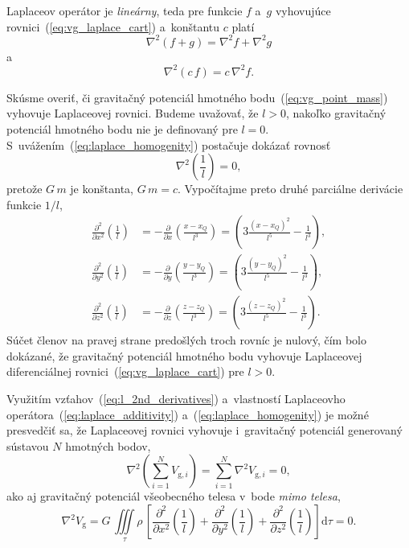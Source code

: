 \documentclass[a4paper,12pt]{book}
\newcommand{\diff}{\mathrm d}
\newcommand{\gidx}{\mathrm g}
\begin{document}
Laplaceov operátor je \emph{lineárny}, teda pre funkcie
$f$ a~$g$ vyhovujúce rovnici~(\ref{eq:vg_laplace_cart}) a~konštantu $c$ platí
%
\begin{equation}
\label{eq:laplace_additivity}
\nabla^2 \left(f + g \right) = \nabla^2 f + \nabla^2 g
\end{equation}
%
a
%
\begin{equation}
\label{eq:laplace_homogenity}
\nabla^2 (c \, f) = c \, \nabla^2 f{.}
\end{equation}

Skúsme overiť, či gravitačný potenciál hmotného bodu~(\ref{eq:vg_point_mass})
vyhovuje Laplaceovej rovnici.  Budeme uvažovať, že $l > 0$, nakoľko gravitačný
potenciál hmotného bodu nie je definovaný pre $l = 0$.
S~uvážením~(\ref{eq:laplace_homogenity}) postačuje dokázať rovnosť
%
\begin{equation}
\label{eq:nabla_l}
\nabla^2 \left( \frac{1}{l} \right) = 0{,}
\end{equation}
%
pretože $G \, m$ je konštanta, $G \, m = c$.  Vypočítajme preto druhé parciálne
derivácie funkcie $1 \slash l$,
%
\begin{equation}
\label{eq:l_2nd_derivatives}
\begin{split}
\frac{\partial^2}{\partial x^2} \left( \frac{1}{l} \right) &=
-\frac{\partial}{\partial x} \left( \frac{x - x_Q}{l^3} \right) = \left(3
\frac{(x - x_Q)^2}{l^5} - \frac{1}{l^3} \right){,}\\
%
\frac{\partial^2}{\partial y^2} \left( \frac{1}{l} \right) &=
-\frac{\partial}{\partial y} \left( \frac{y - y_Q}{l^3} \right) = \left(3
\frac{(y - y_Q)^2}{l^5} - \frac{1}{l^3} \right){,}\\
%
\frac{\partial^2}{\partial z^2} \left( \frac{1}{l} \right) &=
-\frac{\partial}{\partial z} \left( \frac{z - z_Q}{l^3} \right) = \left(3
\frac{(z - z_Q)^2}{l^5} - \frac{1}{l^3} \right){.}
\end{split}
\end{equation}
%
Súčet členov na pravej strane predošlých troch rovníc je nulový, čím bolo
dokázané, že gravitačný potenciál hmotného bodu vyhovuje Laplaceovej
diferenciálnej rovnici~(\ref{eq:vg_laplace_cart}) pre $l > 0$.

Využitím vzťahov~(\ref{eq:l_2nd_derivatives}) a~vlastností Laplaceovho
operátora~(\ref{eq:laplace_additivity}) a~(\ref{eq:laplace_homogenity}) je
možné presvedčiť sa, že Laplaceovej rovnici vyhovuje i~gravitačný potenciál
generovaný sústavou $N$ hmotných bodov,
%
\begin{equation}
\nabla^2 \left( \sum_{i = 1}^N V_{\gidx,i} \right) = \sum_{i = 1}^N \nabla^2
V_{\gidx,i} = 0{,}
\end{equation}
%
ako aj gravitačný potenciál všeobecného telesa v~bode \emph{mimo telesa},
%
\begin{equation}
\nabla^2 V_\gidx = G\, \iiint\limits_\tau \rho \, \left[ 
\frac{\partial^2}{\partial
x^2}\left(\frac{1}{l}\right) + \frac{\partial^2}{\partial
y^2}\left(\frac{1}{l}\right) + \frac{\partial^2}{\partial
z^2}\left(\frac{1}{l}\right) \right] \diff\tau = 0{.}
\end{equation}
\end{document}
